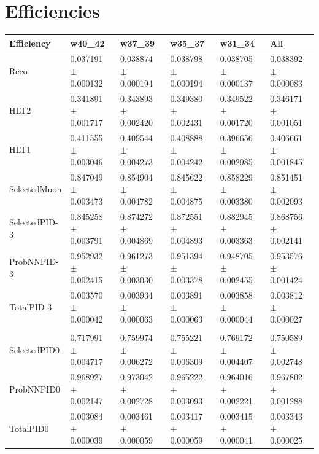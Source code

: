\documentclass[12pt,a4paper]{article}
\begin{document}
\section{Efficiencies}
\begin{table}[h]
\centering
\begin{tabular}{llllll}
\hline
 Efficiency    & w40\_42                 & w37\_39                 & w35\_37                 & w31\_34                 & All                     \\
\hline
 Reco          & 0.037191 $\pm$ 0.000132 & 0.038874 $\pm$ 0.000194 & 0.038798 $\pm$ 0.000194 & 0.038705 $\pm$ 0.000137 & 0.038392 $\pm$ 0.000083 \\
 HLT2          & 0.341891 $\pm$ 0.001717 & 0.343893 $\pm$ 0.002420 & 0.349380 $\pm$ 0.002431 & 0.349522 $\pm$ 0.001720 & 0.346171 $\pm$ 0.001051 \\
 HLT1          & 0.411555 $\pm$ 0.003046 & 0.409544 $\pm$ 0.004273 & 0.408888 $\pm$ 0.004242 & 0.396656 $\pm$ 0.002985 & 0.406661 $\pm$ 0.001845 \\
 SelectedMuon  & 0.847049 $\pm$ 0.003473 & 0.854904 $\pm$ 0.004782 & 0.845622 $\pm$ 0.004875 & 0.858229 $\pm$ 0.003380 & 0.851451 $\pm$ 0.002093 \\
 SelectedPID-3 & 0.845258 $\pm$ 0.003791 & 0.874272 $\pm$ 0.004869 & 0.872551 $\pm$ 0.004893 & 0.882945 $\pm$ 0.003363 & 0.868756 $\pm$ 0.002141 \\
 ProbNNPID-3   & 0.952932 $\pm$ 0.002415 & 0.961273 $\pm$ 0.003030 & 0.951394 $\pm$ 0.003378 & 0.948705 $\pm$ 0.002455 & 0.953576 $\pm$ 0.001424 \\
 TotalPID-3    & 0.003570 $\pm$ 0.000042 & 0.003934 $\pm$ 0.000063 & 0.003891 $\pm$ 0.000063 & 0.003858 $\pm$ 0.000044 & 0.003812 $\pm$ 0.000027 \\
 \hline        &                         &                         &                         &                         &                         \\
 SelectedPID0  & 0.717991 $\pm$ 0.004717 & 0.759974 $\pm$ 0.006272 & 0.755221 $\pm$ 0.006309 & 0.769172 $\pm$ 0.004407 & 0.750589 $\pm$ 0.002748 \\
 ProbNNPID0    & 0.968927 $\pm$ 0.002147 & 0.973042 $\pm$ 0.002728 & 0.965222 $\pm$ 0.003093 & 0.964016 $\pm$ 0.002221 & 0.967802 $\pm$ 0.001288 \\
 TotalPID0     & 0.003084 $\pm$ 0.000039 & 0.003461 $\pm$ 0.000059 & 0.003417 $\pm$ 0.000059 & 0.003415 $\pm$ 0.000041 & 0.003343 $\pm$ 0.000025 \\

\end{tabular}
\end{table}
\end{document}
